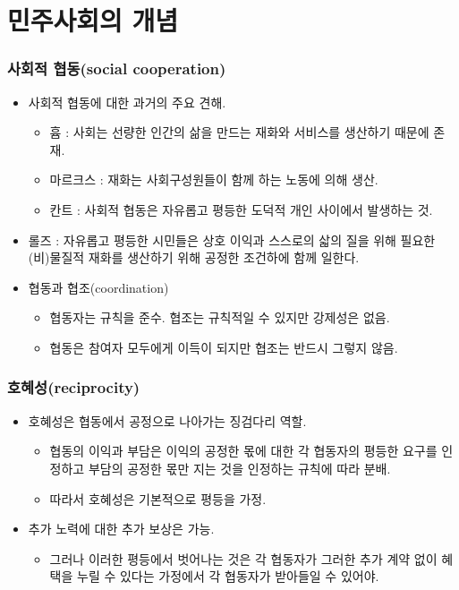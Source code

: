 \documentclass[aspectratio=169,xcolor=dvipsnames,handout]{beamer}
\begin{document}
\section{민주사회의 개념}
\begin{frame}[<+->]
\frametitle{사회적 협동(social cooperation)}
    \begin{itemize}
        \item 사회적 협동에 대한 과거의 주요 견해.
        \begin{itemize}
            \item 흄 : 사회는 선량한 인간의 삶을 만드는 재화와 서비스를 생산하기 때문에 존재.
            \item 마르크스 : 재화는 사회구성원들이 함께 하는 노동에 의해 생산.
            \item 칸트 : 사회적 협동은 자유롭고 평등한 도덕적 개인 사이에서 발생하는 것.
        \end{itemize}
        \item 롤즈 : 자유롭고 평등한 시민들은 상호 이익과 스스로의 삷의 질을 위해 필요한 (비)물질적 재화를 생산하기 위해 공정한 조건하에 함께 일한다.
        \item 협동과 협조(coordination) 
        \begin{itemize}
            \item 협동자는 규칙을 준수. 협조는 규칙적일 수 있지만 강제성은 없음.
            \item 협동은 참여자 모두에게 이득이 되지만 협조는 반드시 그렇지 않음.
        \end{itemize}
    \end{itemize}
\end{frame}

\begin{frame}[<+->]
\frametitle{호혜성(reciprocity)}
    \begin{itemize}
        \item 호혜성은 협동에서 공정으로 나아가는 징검다리 역할.
        \begin{itemize}
            \item 협동의 이익과 부담은 이익의 공정한 몫에 대한 각 협동자의 평등한 요구를 인정하고 부담의 공정한 몫만 지는 것을 인정하는 규칙에 따라 분배.
            \item 따라서 호혜성은 기본적으로 평등을 가정.
        \end{itemize}
        \item 추가 노력에 대한 추가 보상은 가능.
        \begin{itemize}
            \item 그러나 이러한 평등에서 벗어나는 것은 각 협동자가 그러한 추가 계약 없이 혜택을 누릴 수 있다는 가정에서 각 협동자가 받아들일 수 있어야.
        \end{itemize}
    \end{itemize}
\end{frame}
\end{document}
